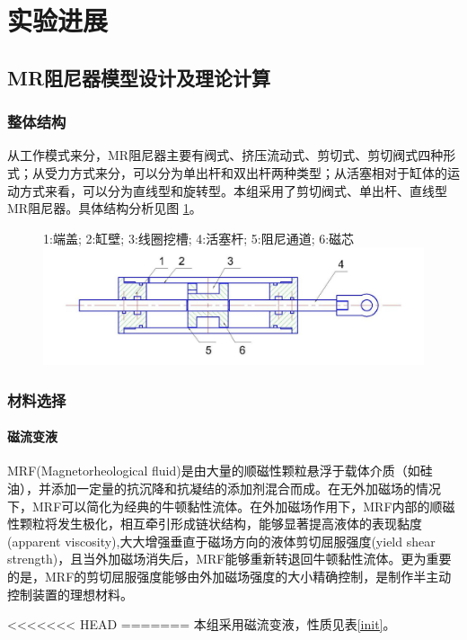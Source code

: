 \section{实验进展}
\subsection{MR阻尼器模型设计及理论计算}
\subsubsection{整体结构}
从工作模式来分，MR阻尼器主要有阀式、挤压流动式、剪切式、剪切阀式四种形式；从受力方式来分，可以分为单出杆和双出杆两种类型；从活塞相对于缸体的运动方式来看，可以分为直线型和旋转型。本组采用了剪切阀式、单出杆、直线型MR阻尼器。具体结构分析见图 \ref{mrdamper}。

\begin{figure}[H]
	\centering
		{1:端盖; 2:缸壁; 3:线圈挖槽; 4:活塞杆; 5:阻尼通道; 6:磁芯}
		\label{mrdamper}
	\includegraphics[width=6in]{figure/mrdamper}
\end{figure}

\subsubsection{材料选择}
\paragraph{磁流变液}
\qquad MRF(Magnetorheological fluid)是由大量的顺磁性颗粒悬浮于载体介质（如硅油），并添加一定量的抗沉降和抗凝结的添加剂混合而成。在无外加磁场的情况下，MRF可以简化为经典的牛顿黏性流体。在外加磁场作用下，MRF内部的顺磁性颗粒将发生极化，相互牵引形成链状结构，能够显著提高液体的表现黏度(apparent viscosity),大大增强垂直于磁场方向的液体剪切屈服强度(yield shear strength)，且当外加磁场消失后，MRF能够重新转退回牛顿黏性流体。更为重要的是，MRF的剪切屈服强度能够由外加磁场强度的大小精确控制，是制作半主动控制装置的理想材料。

<<<<<<< HEAD
=======
本组采用磁流变液，性质见表\ref{init}。

